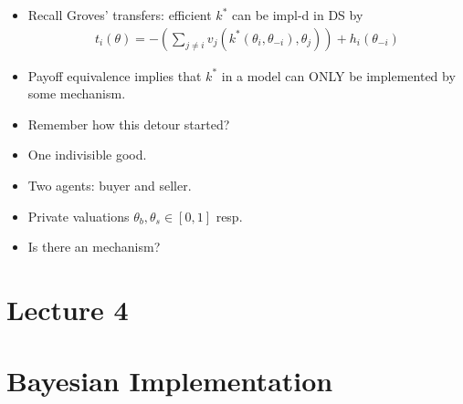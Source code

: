 \documentclass[english]{beamer}		%
\def\lyxframeend{} %
\begin{document}
\begin{itemize}
	\item Recall Groves' transfers: efficient $k^*$ can be impl-d in DS by
	\vspace{-0.5em}\begin{align*}
		t_{i}(\theta)=-\left(\sum_{j\neq i} v_{j}(k^*(\theta_i, \theta_{-i}), \theta_{j}) \right) + h_{i}(\theta_{-i})
	\end{align*}\vspace{-1em}
	
	\pause
	\item Payoff equivalence implies that  $k^*$ in a  model can \alert{ONLY} be implemented by some  mechanism.
\end{itemize}
\lyxframeend


\begin{itemize}
	\item Remember how this detour started?
\end{itemize}
\begin{example}
	\begin{itemize}
		\item One indivisible good.
		\item Two agents: buyer and seller. 
		\item Private valuations $\theta_b,\theta_s \in [0,1]$ resp.
		\item Is there an  mechanism?
	\end{itemize}
\end{example}
\lyxframeend




\section{Lecture 4}

\section{Bayesian Implementation}
\end{document}

